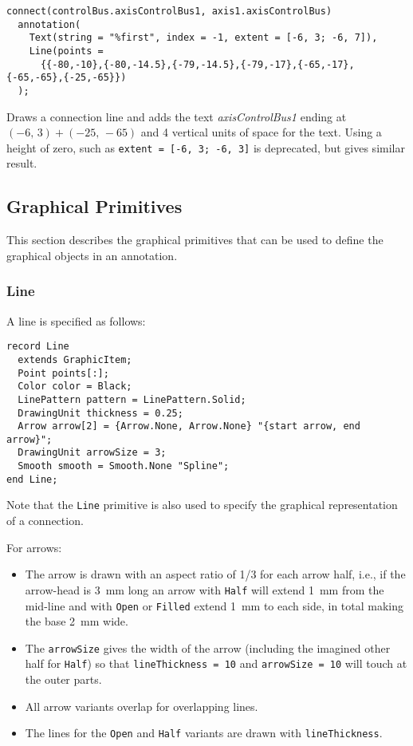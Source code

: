 \begin{example}
\begin{lstlisting}[language=modelica]
connect(controlBus.axisControlBus1, axis1.axisControlBus)
  annotation(
    Text(string = "%first", index = -1, extent = [-6, 3; -6, 7]),
    Line(points =
      {{-80,-10},{-80,-14.5},{-79,-14.5},{-79,-17},{-65,-17},{-65,-65},{-25,-65}})
  );
\end{lstlisting}
Draws a connection line and adds the text \emph{axisControlBus1} ending at $(-6,\, 3) + (-25,\, -65)$ and 4 vertical units of space for the text.
Using a height of zero, such as \lstinline!extent = [-6, 3; -6, 3]! is deprecated, but gives similar result.
\end{example}

\subsection{Graphical Primitives}\label{graphical-primitives}

This section describes the graphical primitives that can be used to
define the graphical objects in an annotation.

\subsubsection{Line}\label{line}

A line is specified as follows:
\begin{lstlisting}[language=modelica]
record Line
  extends GraphicItem;
  Point points[:];
  Color color = Black;
  LinePattern pattern = LinePattern.Solid;
  DrawingUnit thickness = 0.25;
  Arrow arrow[2] = {Arrow.None, Arrow.None} "{start arrow, end arrow}";
  DrawingUnit arrowSize = 3;
  Smooth smooth = Smooth.None "Spline";
end Line;
\end{lstlisting}%
Note that the \lstinline!Line! primitive is also used to specify the graphical representation of a connection.

For arrows:
\begin{itemize}
\item
  The arrow is drawn with an aspect ratio of 1/3 for each arrow half, i.e., if the arrow-head is 3~mm long an arrow with \lstinline!Half! will extend 1~mm from the mid-line and with \lstinline!Open! or \lstinline!Filled! extend 1~mm to each side, in total making the base 2~mm wide.
\item
  The \lstinline!arrowSize! gives the width of the arrow (including the imagined other half for \lstinline!Half!) so that \lstinline!lineThickness = 10! and \lstinline!arrowSize = 10! will touch at the outer parts.
\item
  All arrow variants overlap for overlapping lines.
\item
  The lines for the \lstinline!Open! and \lstinline!Half! variants are drawn with \lstinline!lineThickness!.
\end{itemize}

